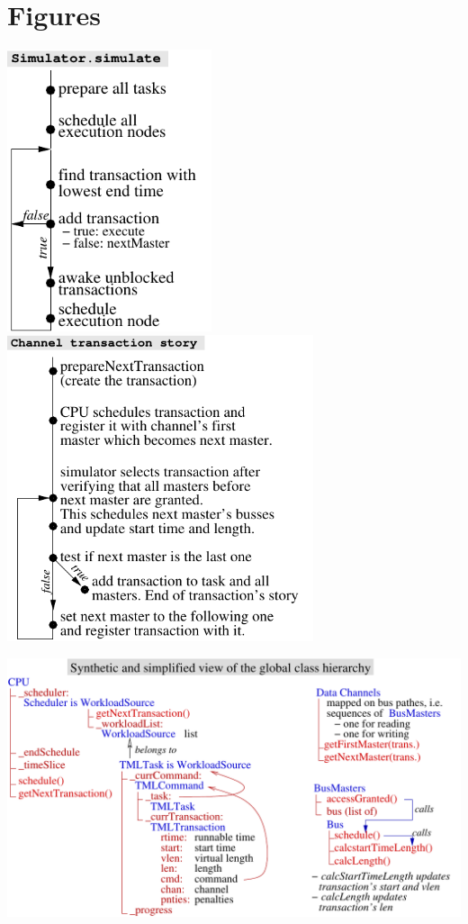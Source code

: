 \documentclass[a4paper,11pt]{article}
\begin{document}
\section*{Figures}
\includegraphics[width=6cm]{images/simulate.pdf}\hspace{5mm}
\includegraphics[width=9cm]{images/channelTrans.pdf}

\vspace{5mm}
\includegraphics[width=15.5cm]{images/ClassDiag1.pdf}
\end{document}
